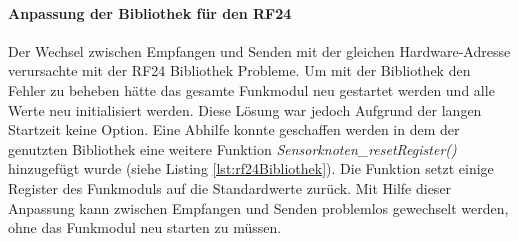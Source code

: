 \paragraph{Anpassung der Bibliothek für den RF24} Der Wechsel zwischen Empfangen und Senden mit der gleichen Hardware-Adresse verursachte mit der RF24 Bibliothek Probleme. Um mit der Bibliothek den Fehler zu beheben hätte das gesamte Funkmodul neu gestartet werden und alle Werte neu initialisiert werden. Diese Lösung war jedoch Aufgrund der langen Startzeit keine Option. Eine Abhilfe konnte geschaffen werden in dem der genutzten Bibliothek eine weitere Funktion \textit{Sensorknoten\_resetRegister()} hinzugefügt wurde (siehe Listing \ref{lst:rf24Bibliothek}). Die Funktion setzt einige Register des Funkmoduls auf die Standardwerte zurück. Mit Hilfe dieser Anpassung kann zwischen Empfangen und Senden problemlos gewechselt werden, ohne das Funkmodul neu starten zu müssen.


